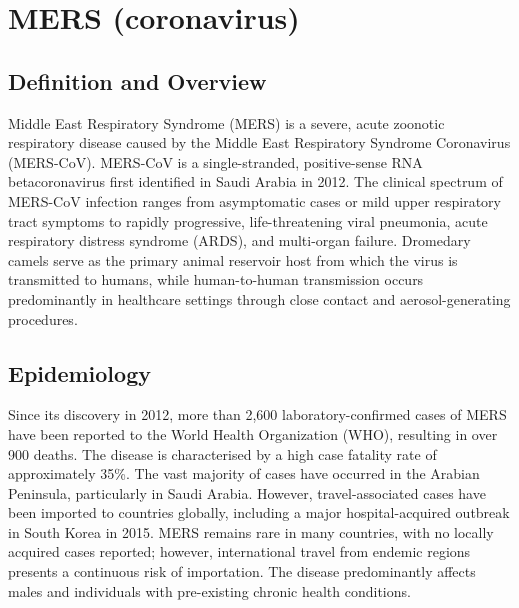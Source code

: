 \chapter{MERS (coronavirus)}

\section*{Definition and Overview}
Middle East Respiratory Syndrome (MERS) is a severe, acute zoonotic respiratory disease caused by the Middle East Respiratory Syndrome Coronavirus (MERS-CoV). MERS-CoV is a single-stranded, positive-sense RNA betacoronavirus first identified in Saudi Arabia in 2012. The clinical spectrum of MERS-CoV infection ranges from asymptomatic cases or mild upper respiratory tract symptoms to rapidly progressive, life-threatening viral pneumonia, acute respiratory distress syndrome (ARDS), and multi-organ failure. Dromedary camels serve as the primary animal reservoir host from which the virus is transmitted to humans, while human-to-human transmission occurs predominantly in healthcare settings through close contact and aerosol-generating procedures.

\section*{Epidemiology}
Since its discovery in 2012, more than 2,600 laboratory-confirmed cases of MERS have been reported to the World Health Organization (WHO), resulting in over 900 deaths. The disease is characterised by a high case fatality rate of approximately 35\%. The vast majority of cases have occurred in the Arabian Peninsula, particularly in Saudi Arabia. However, travel-associated cases have been imported to countries globally, including a major hospital-acquired outbreak in South Korea in 2015. MERS remains rare in many countries, with no locally acquired cases reported; however, international travel from endemic regions presents a continuous risk of importation. The disease predominantly affects males and individuals with pre-existing chronic health conditions.


